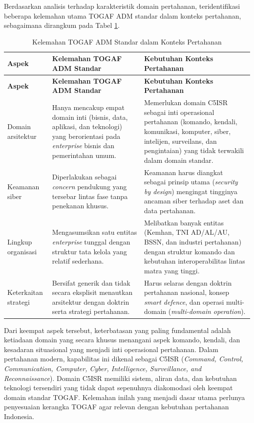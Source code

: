 Berdasarkan analisis terhadap karakteristik domain pertahanan, teridentifikasi beberapa kelemahan utama TOGAF ADM standar dalam konteks pertahanan, sebagaimana dirangkum pada Tabel \ref{tab:kelemahan-togaf}.

\begin{longtable}{|p{2.6cm}|p{5.2cm}|p{5.2cm}|}
\caption{Kelemahan TOGAF ADM Standar dalam Konteks Pertahanan}
\label{tab:kelemahan-togaf} \\
\hline
\textbf{Aspek} & \textbf{Kelemahan TOGAF ADM Standar} & \textbf{Kebutuhan Konteks Pertahanan} \\
\hline
\endfirsthead
\hline
\textbf{Aspek} & \textbf{Kelemahan TOGAF ADM Standar} & \textbf{Kebutuhan Konteks Pertahanan} \\
\hline
\endhead
Domain arsitektur & Hanya mencakup empat domain inti (bisnis, data, aplikasi, dan teknologi) yang berorientasi pada \textit{enterprise} bisnis dan pemerintahan umum. & Memerlukan domain C5ISR sebagai inti operasional pertahanan (komando, kendali, komunikasi, komputer, siber, intelijen, surveilans, dan pengintaian) yang tidak terwakili dalam domain standar. \\
\hline
Keamanan siber & Diperlakukan sebagai \textit{concern} pendukung yang tersebar lintas fase tanpa penekanan khusus. & Keamanan harus diangkat sebagai prinsip utama (\textit{security by design}) mengingat tingginya ancaman siber terhadap aset dan data pertahanan. \\
\hline
Lingkup organisasi & Mengasumsikan satu entitas \textit{enterprise} tunggal dengan struktur tata kelola yang relatif sederhana. & Melibatkan banyak entitas (Kemhan, TNI AD/AL/AU, BSSN, dan industri pertahanan) dengan struktur komando dan kebutuhan interoperabilitas lintas matra yang tinggi. \\
\hline
Keterkaitan strategi & Bersifat generik dan tidak secara eksplisit menautkan arsitektur dengan doktrin serta strategi pertahanan. & Harus selaras dengan doktrin pertahanan nasional, konsep \textit{smart defence}, dan operasi multi-domain (\textit{multi-domain operation}). \\
\hline
\end{longtable}

Dari keempat aspek tersebut, keterbatasan yang paling fundamental adalah ketiadaan domain yang secara khusus menangani aspek komando, kendali, dan kesadaran situasional yang menjadi inti operasional pertahanan.
Dalam pertahanan modern, kapabilitas ini dikenal sebagai C5ISR (\textit{Command, Control, Communication, Computer, Cyber, Intelligence, Surveillance, and Reconnaissance}).
Domain C5ISR memiliki sistem, aliran data, dan kebutuhan teknologi tersendiri yang tidak dapat sepenuhnya diakomodasi oleh keempat domain standar TOGAF.
Kelemahan inilah yang menjadi dasar utama perlunya penyesuaian kerangka TOGAF agar relevan dengan kebutuhan pertahanan Indonesia.

